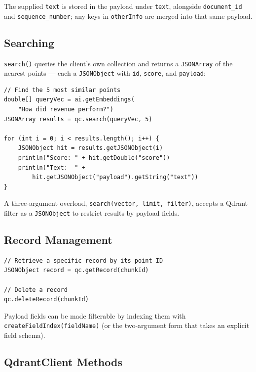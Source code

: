 \noindent
The supplied \texttt{text} is stored in the payload under \texttt{text}, alongside \texttt{document\_id} and \texttt{sequence\_number}; any keys in \texttt{otherInfo} are merged into that same payload.

\subsection{Searching}

\texttt{search()} queries the client's own collection and returns a \texttt{JSONArray} of the nearest points --- each a \texttt{JSONObject} with \texttt{id}, \texttt{score}, and \texttt{payload}:

\begin{lstlisting}[style=groovy]
// Find the 5 most similar points
double[] queryVec = ai.getEmbeddings(
    "How did revenue perform?")
JSONArray results = qc.search(queryVec, 5)

for (int i = 0; i < results.length(); i++) {
    JSONObject hit = results.getJSONObject(i)
    println("Score: " + hit.getDouble("score"))
    println("Text:  " +
        hit.getJSONObject("payload").getString("text"))
}
\end{lstlisting}

\noindent
A three-argument overload, \texttt{search(vector, limit, filter)}, accepts a Qdrant filter as a \texttt{JSONObject} to restrict results by payload fields.

\subsection{Record Management}

\begin{lstlisting}[style=groovy]
// Retrieve a specific record by its point ID
JSONObject record = qc.getRecord(chunkId)

// Delete a record
qc.deleteRecord(chunkId)
\end{lstlisting}

\noindent
Payload fields can be made filterable by indexing them with \texttt{createFieldIndex(fieldName)} (or the two-argument form that takes an explicit field schema).

\subsection{QdrantClient Methods}

